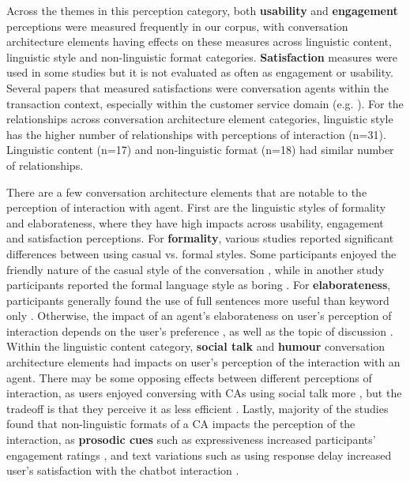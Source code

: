 \documentclass[sigconf,screen,review, anonymous]{acmart}
\newcommand{\cmt}[1]{}%
\begin{document}
Across the themes in this perception category, both \textbf{usability} and \textbf{engagement} perceptions were measured frequently in our corpus, with conversation architecture elements having effects on these measures across linguistic content, linguistic style and non-linguistic format categories. \textbf{Satisfaction} measures were used in some studies but it is not evaluated as often as engagement or usability. Several papers that measured satisfactions were conversation agents within the transaction context, especially within the customer service domain (e.g. \cite{diederich2019emulating}\cmt{[25]}\cite{elsholz2019exploring}\cmt{[61]}\cite{gnewuch2018faster}\cmt{[19]}). For the relationships across conversation architecture element categories, linguistic style has the higher number of relationships with perceptions of interaction (n=31). Linguistic content (n=17) and non-linguistic format (n=18) had similar number of relationships.

There are a few conversation architecture elements that are notable to the perception of interaction with agent. First are the linguistic styles of formality and elaborateness, where they have high impacts across usability, engagement and satisfaction perceptions. For \textbf{formality}, various studies reported significant differences between using casual vs. formal styles. Some participants enjoyed the friendly nature of the casual style of the conversation \cite{cox2022does}\cmt{[27]}, while in another study participants reported the formal language style as boring \cite{kim2019comparing}\cmt{[89]}. For \textbf{elaborateness}, participants generally found the use of full sentences more useful than keyword only \cite{haas2022keep}\cmt{[78]}\cite{roy2021users}\cmt{[71]}. Otherwise, the impact of an agent's elaborateness on user's perception of interaction depends on the user's preference \cite{miehle2018exploring}\cmt{[51]}, as well as the topic of discussion \cite{haas2022keep}\cmt{[78]}. Within the linguistic content category, \textbf{social talk} and \textbf{humour} conversation architecture elements had impacts on user's perception of the interaction with an agent. There may be some opposing effects between different perceptions of interaction, as users enjoyed conversing with CAs using social talk more \cite{lee2020hear}\cmt{[23]}\cite{roy2021users}\cmt{[71]}, but the tradeoff is that they perceive it as less efficient \cite{roy2021users}\cmt{[71]}. Lastly, majority of the studies found that non-linguistic formats of a CA impacts the perception of the interaction, as \textbf{prosodic cues} such as expressiveness increased participants' engagement ratings \cite{zhu2022effects}\cmt{[26]}, and text variations such as using response delay increased user's satisfaction with the chatbot interaction \cite{gnewuch2018faster}\cmt{[19]}.
\end{document}
